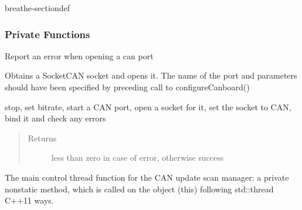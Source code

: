 \documentclass[a4paper,10pt,english]{sphinxmanual}
\begin{document}
\begin{fulllineitems}
%
\pysigstartmultiline
{}%
\pysigstopmultiline
\begin{sphinxuseclass}{breathe-sectiondef}\subsubsection*{Private Functions}


\begin{fulllineitems}
%
\pysigstartmultiline
{}%
\pysigstopmultiline
\sphinxAtStartPar
Report an error when opening a can port 

\end{fulllineitems}



\begin{fulllineitems}
%
\pysigstartmultiline
{}%
\pysigstopmultiline
\sphinxAtStartPar
Obtains a SocketCAN socket and opens it. The name of the port and parameters should have been specified by preceding call to configureCanboard()

\sphinxAtStartPar

stop, set bitrate, start a CAN port, open a socket for it, set the socket to CAN, bind it and check any errors 
\begin{quote}\begin{description}
\item[{Returns}] \leavevmode
\sphinxAtStartPar
less than zero in case of error, otherwise success

\end{description}\end{quote}

\end{fulllineitems}



\begin{fulllineitems}
%
\pysigstartmultiline
{}%
\pysigstopmultiline
\sphinxAtStartPar
The main control thread function for the CAN update scan manager: a private non\sphinxhyphen{}static method, which is called on the object (this) following std::thread C++11 ways.


\end{fulllineitems}
\end{sphinxuseclass}
\end{fulllineitems}
\end{document}
